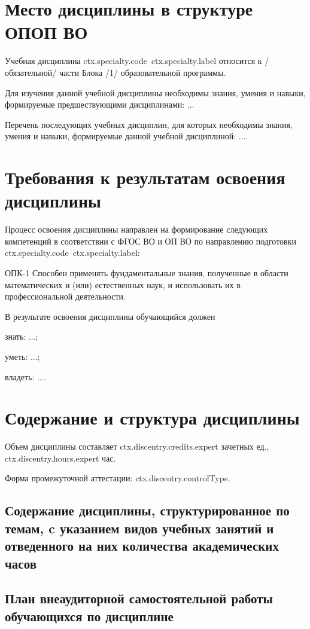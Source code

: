 \documentclass[12pt]{scrartcl}
\begin{document}
\section{Место дисциплины в структуре ОПОП ВО}
Учебная дисциплина {{ctx.specialty.code}}~{{ctx.specialty.label}} относится к /обязательной/ части Блока /1/ образовательной программы.

Для изучения данной учебной дисциплины необходимы знания, умения и навыки,
формируемые предшествующими дисциплинами: ...

Перечень последующих учебных дисциплин, для которых необходимы знания, умения и
навыки, формируемые данной учебной дисциплиной: ....


\section{Требования к результатам освоения дисциплины}

Процесс освоения дисциплины направлен на формирование следующих компетенций в
соответствии с ФГОС ВО и ОП ВО по направлению подготовки {{ctx.specialty.code}}~{{ctx.specialty.label}}:

ОПК-1 Способен применять фундаментальные знания, полученные в области
математических и (или) естественных наук, и использовать их в профессиональной
деятельности.

В результате освоения дисциплины обучающийся должен

знать: ...;

уметь: ...;

владеть: ....

\section{Содержание и структура дисциплины}

Объем дисциплины составляет {{ctx.discentry.credits.expert}} зачетных ед., {{ctx.discentry.hours.expert}} час.

Форма промежуточной аттестации: {{ctx.discentry.controlType}}.

\subsection{Содержание дисциплины, структурированное по темам, c указанием видов
  учебных занятий и отведенного на них количества академических часов}

\subsection{План внеаудиторной самостоятельной работы обучающихся по дисциплине}
\end{document}
